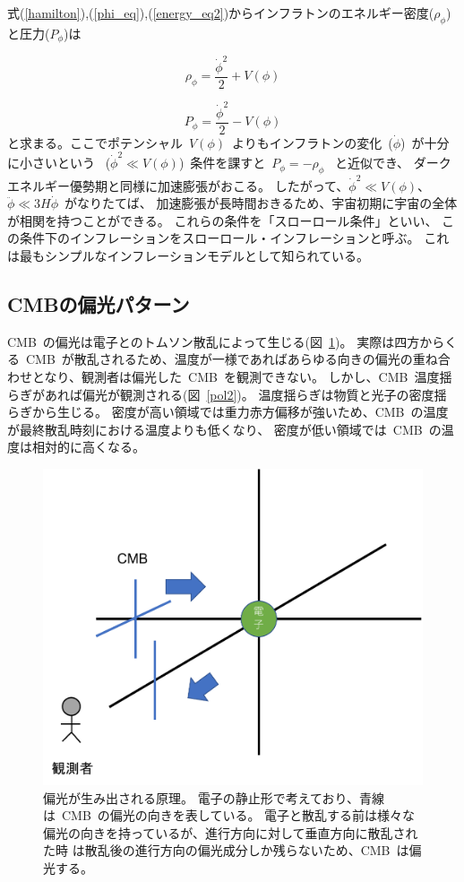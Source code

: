 式(\ref{hamilton}),(\ref{phi_eq}),(\ref{energy_eq2})からインフラトンのエネルギー密度($\rho_{\phi}$)と圧力($P_{\phi}$)は

\begin{equation}
  \rho_{\phi} = \frac{\dot{\phi}^2}{2} + V(\phi)
\end{equation}

\begin{equation}
  P_{\phi} = \frac{\dot{\phi}^2}{2} - V(\phi)
\end{equation}
と求まる。ここでポテンシャル~$V(\phi)$~よりもインフラトンの変化~($\dot{\phi}$)~が十分に小さいという
~($\dot{\phi}^2 \ll V(\phi)$)~条件を課すと~$P_{\phi} = -\rho_{\phi}$
~と近似でき、
ダークエネルギー優勢期と同様に加速膨張がおこる。
したがって、$\dot{\phi}^2 \ll V(\phi)$、$\ddot{\phi} \ll 3H\dot{\phi}$~がなりたてば、
加速膨張が長時間おきるため、宇宙初期に宇宙の全体が相関を持つことができる。
これらの条件を「スローロール条件」といい、
この条件下のインフレーションをスローロール・インフレーションと呼ぶ。
これは最もシンプルなインフレーションモデルとして知られている。


\subsection{CMBの偏光パターン}
CMB~の偏光は電子とのトムソン散乱によって生じる(図~\ref{pol1})。
実際は四方からくる~CMB~が散乱されるため、温度が一様であればあらゆる向きの偏光の重ね合わせとなり、観測者は偏光した~CMB~を観測できない。
しかし、CMB~温度揺らぎがあれば偏光が観測される(図~\ref{pol2})。
温度揺らぎは物質と光子の密度揺らぎから生じる。
密度が高い領域では重力赤方偏移が強いため、CMB~の温度が最終散乱時刻における温度よりも低くなり、
密度が低い領域では~CMB~の温度は相対的に高くなる。


\begin{figure}[htbp]
  \centering
  \includegraphics[width=0.8\columnwidth]{2_cosmology/figs/pol1.pdf}
  \caption{偏光が生み出される原理。
  電子の静止形で考えており、青線は~CMB~の偏光の向きを表している。
  電子と散乱する前は様々な偏光の向きを持っているが、進行方向に対して垂直方向に散乱された時
  は散乱後の進行方向の偏光成分しか残らないため、CMB~は偏光する。}
  \label{pol1}
\end{figure}

